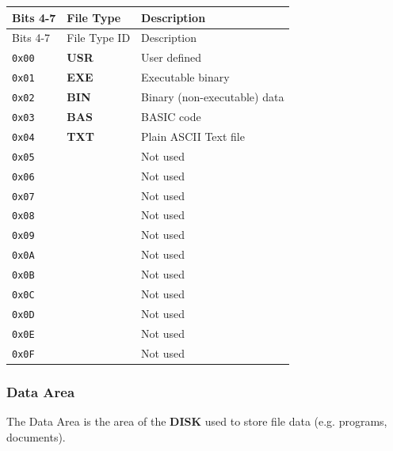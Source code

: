 \documentclass[a4paper,11pt]{article}
\begin{document}
        \begin{longtable}{ |m{1.4cm}|m{1.7cm}|m{6.8cm}| }
            \hline
            \rowcolor{lightgray}
            Bits 4-7 & File Type & Description\\
            \hline
            \endfirsthead

            \hline
            \rowcolor{lightgray}
            Bits 4-7 & File Type ID & Description\\
            \hline
            \endhead

            \texttt{0x00} & \textbf{USR} & User defined\\
            \texttt{0x01} & \textbf{EXE} & Executable binary\\
            \texttt{0x02} & \textbf{BIN} & Binary (non-executable) data\\
            \texttt{0x03} & \textbf{BAS} & BASIC code\\
            \texttt{0x04} & \textbf{TXT} & Plain ASCII Text file\\
            \texttt{0x05} & & Not used\\
            \texttt{0x06} & & Not used\\
            \texttt{0x07} & & Not used\\
            \texttt{0x08} & & Not used\\
            \texttt{0x09} & & Not used\\
            \texttt{0x0A} & & Not used\\
            \texttt{0x0B} & & Not used\\
            \texttt{0x0C} & & Not used\\
            \texttt{0x0D} & & Not used\\
            \texttt{0x0E} & & Not used\\
            \texttt{0x0F} & & Not used\\
            \hline
        \end{longtable}

        \subsubsection{Data Area}
        The Data Area is the area of the \textbf{DISK} used to store file data 
        (e.g. programs, documents).
        
\end{document}
